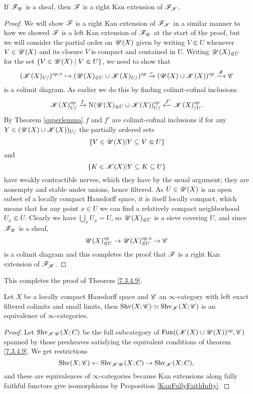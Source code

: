 \documentclass[../../thesis.tex]{subfiles}
\begin{document}
\begin{lemma}
    If $\mathscr{F}_{\mathscr{U}}$ is a sheaf, then $\mathscr{F}$ is a right Kan extension of $\mathscr{F}_{\mathscr{K}}$.
\end{lemma}
\begin{proof}
    We will show $\mathscr{F}$ is a right Kan extension of $\mathscr{F}_{\mathscr{K}}$ in a similar manner to how we showed $\mathscr{F}$ is a left Kan extension of $\mathscr{F}_{\mathscr{U}}$ at the start of the proof, but we will consider the partial order on $\mathscr{U}(X)$ given by writing $V\Subset U$ whenever $V\in \mathscr{U}(X)$ and its closure $\overline{V}$ is compact and contained in $U$.
    Writing $\mathscr{U}(X)_{\Subset U}$ for the set $\{V\in \mathscr{U}(X) \mid V\Subset U\}$, we need to show that
    \[
        (\mathscr{K}(X)_{U/})^{op,\triangleleft} \hookrightarrow (\mathscr{U}(X)_{\Subset U} \cup \mathscr{K}(X)_{U/})^{op} \xrightarrow{c}(\mathscr{U}(X) \cup \mathscr{K}(X))^{op} \xrightarrow{\mathscr{F}} \mathscr{C}
    \]
    is a colimit diagram.
    As earlier we do this by finding colimit-cofinal inclusions
    \[
        \mathscr{K}(X)_{U/}^{op} \xrightarrow{f}\mathrm{N}(\mathscr{U}(X)_{\Subset U} \cup \mathscr{K}(X))_{U/}^{op} \xleftarrow{f'} \mathscr{K}(X)_{/U}^{op}.
    \]
    By Theorem \ref{superlemma} $f$ and $f'$ are colimit-cofinal inclusions if for any $Y\in (\mathscr{U}(X) \cup \mathscr{K}(X))_{U/}$ the partially ordered sets
    \[
        \{ V \in \mathscr{U}(X) |Y \subseteq V \Subset U \}
    \]
    and
    \[
        \{ K \in \mathscr{K}(X) |Y \subseteq K \subseteq U \}
    \]
    have weakly contractible nerves, which they have by the usual argument; they are nonempty and stable under unions, hence filtered.
    As $U\in \mathscr{U}(X)$ is an open subset of a locally compact Hausdorff space, it is itself locally compact, which means that for any point $x \in U$ we can find a relatively compact neighborhood $U_x \Subset U$.
    Clearly we have $\bigcup_x U_x = U$, so $\mathscr{U}(X)_{\Subset U}$ is a sieve covering $U$, and since $\mathscr{F}_{\mathscr{U}}$ is a sheaf,
    \[
        \mathscr{U}(X)_{\Subset U}^{op} \to \mathscr{U}(X)_{\Subset U}^{op, \triangleleft} \to \mathscr{C}
    \]
    is a colimit diagram and this completes the proof that $\mathscr{F}$ is a right Kan extension of $\mathscr{F}_{\mathscr{K}}$.
\end{proof}
This completes the proof of Theorem \ref{7.3.4.9}.
\begin{corollary}\label{7.3.4.10}
    Let $X$ be a locally compact Hausdorff space and $\mathscr{C}$ an $\infty$-category with left exact filtered colimits and small limits, then $\mathrm{Shv}(X;\mathscr{C}) \simeq \mathrm{Shv}_{\mathscr{K}}(X;\mathscr{C})$ is an equivalence of $\infty$-categories.
\end{corollary}
\begin{proof}
    Let $\mathrm{Shv}_{\mathscr{K}\mathscr{U}}(X;C)$ be the full subcategory of $\mathrm{Fun}((\mathscr{K}(X)\cup \mathscr{U}(X))^{op},\mathscr{C})$ spanned by those presheaves satisfying the equivalent conditions of theorem \ref{7.3.4.9}. We get restrictions
    \[
        \mathrm{Shv}(X;\mathscr{C}) \leftarrow \mathrm{Shv}_{\mathscr{K}\mathscr{U}}(X;C) \to \mathrm{Shv}_{\mathscr{K}}(X;C),
    \]
    and these are equivalences of $\infty$-categories because Kan extensions along fully faithful functors give isomorphisms by Proposition \ref{KanFullyFaithInfty}.
\end{proof}
\end{document}
